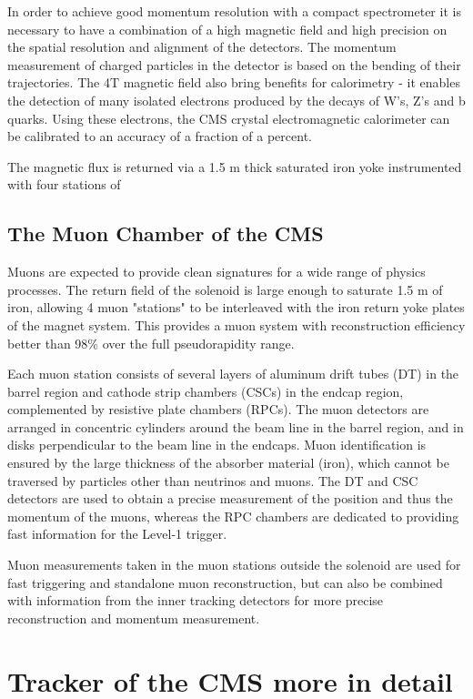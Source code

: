 In order to achieve good momentum resolution with a compact spectrometer it is necessary to have a combination of a high magnetic field and high precision on the spatial resolution and alignment of the detectors. The momentum measurement of charged particles in the detector is based on the bending of their trajectories. The 4T magnetic field also bring benefits for calorimetry - it enables the detection of many isolated electrons produced by the decays of W's, Z's and b quarks. Using these electrons, the CMS crystal electromagnetic calorimeter can be calibrated to an accuracy of a fraction of a percent.

The magnetic flux is returned via a 1.5 m thick saturated iron yoke instrumented with four stations of


\subsection{The Muon Chamber of the CMS}

Muons are expected to provide clean signatures for a wide range of physics processes.
The return field of the solenoid is large enough to saturate 1.5 m of iron, allowing 4 muon "stations" to be interleaved with the iron return yoke plates of the magnet system. This provides a muon system with reconstruction efficiency better than 98\% over the full pseudorapidity range.

Each muon station consists of several layers of aluminum drift tubes (DT) in the barrel region and cathode strip chambers (CSCs) in the endcap region, complemented by resistive plate chambers (RPCs). The muon detectors are arranged in concentric cylinders around the beam line in the barrel region, and in disks perpendicular to the beam line in the endcaps. Muon identification is ensured by the large thickness of the absorber material (iron), which cannot be traversed by particles other than neutrinos and muons. The DT and CSC detectors are used to obtain a precise measurement of the position and thus the momentum of the muons, whereas the RPC chambers are dedicated to providing fast information for the Level-1 trigger.

Muon measurements taken in the muon stations outside the solenoid are used for fast triggering and standalone muon reconstruction, but can also be combined with information from the inner tracking detectors for more precise reconstruction and momentum measurement.

\section{Tracker of the CMS more in detail}

